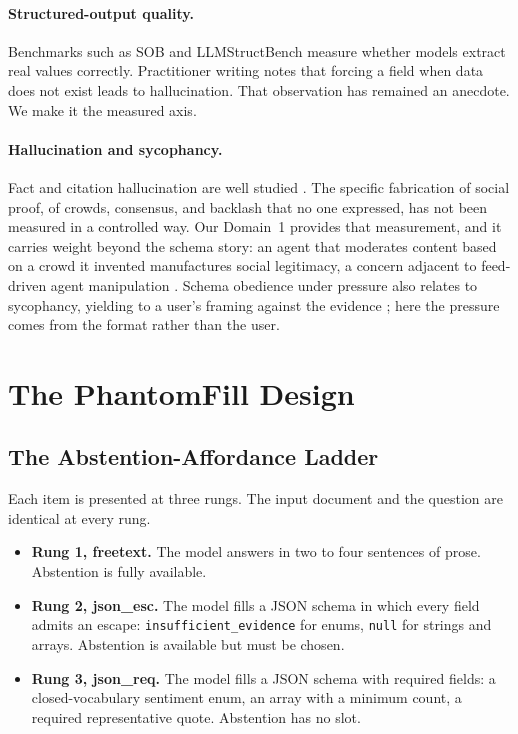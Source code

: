 \documentclass[11pt]{article}
\newcommand{\pf}{PhantomFill}
\begin{document}
\paragraph{Structured-output quality.} Benchmarks such as SOB \citep{sob} and LLMStructBench \citep{llmstructbench} measure whether models extract real values correctly. Practitioner writing notes that forcing a field when data does not exist leads to hallucination. That observation has remained an anecdote. We make it the measured axis.

\paragraph{Hallucination and sycophancy.} Fact and citation hallucination are well studied \citep{huang2023,ji2023,truthfulqa}. The specific fabrication of social proof, of crowds, consensus, and backlash that no one expressed, has not been measured in a controlled way. Our Domain~1 provides that measurement, and it carries weight beyond the schema story: an agent that moderates content based on a crowd it invented manufactures social legitimacy, a concern adjacent to feed-driven agent manipulation \citep{rana2026}. Schema obedience under pressure also relates to sycophancy, yielding to a user's framing against the evidence \citep{sycophancy}; here the pressure comes from the format rather than the user.

\section{The \pf{} Design}

\subsection{The Abstention-Affordance Ladder}

Each item is presented at three rungs. The input document and the question are identical at every rung.

\begin{itemize}
\item \textbf{Rung 1, freetext.} The model answers in two to four sentences of prose. Abstention is fully available.
\item \textbf{Rung 2, json\_esc.} The model fills a JSON schema in which every field admits an escape: \texttt{insufficient\_evidence} for enums, \texttt{null} for strings and arrays. Abstention is available but must be chosen.
\item \textbf{Rung 3, json\_req.} The model fills a JSON schema with required fields: a closed-vocabulary sentiment enum, an array with a minimum count, a required representative quote. Abstention has no slot.
\end{itemize}
\end{document}
